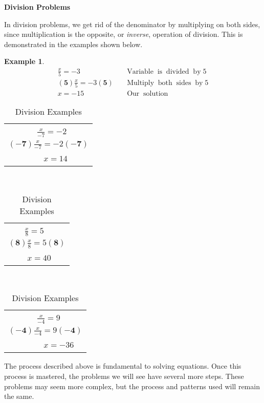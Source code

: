 \documentclass[12pt]{book}
\theoremstyle{definition}
\newtheorem{example}{Example}
\newcommand{\tmmathbf}[1]{\ensuremath{\boldsymbol{#1}}}
\newcommand{\tmop}[1]{\ensuremath{\operatorname{#1}}}
\begin{document}
\par
{\bf Division Problems}\par
In division problems, we get rid of the denominator by multiplying on both sides, since multiplication is the opposite, or \textit{inverse}, operation of division. This is demonstrated in the examples shown below.
\begin{example}\label{Lin11}
  \begin{eqnarray*}
    \frac{x}{5} = - 3 &  & \tmop{Variable} \tmop{is} \tmop{divided} \tmop{by}
    5\\
    \tmmathbf{(5)} \frac{x}{5} = - 3 \tmmathbf{(5)} &  & \tmop{Multiply}
    \tmop{both} \tmop{sides} \tmop{by} 5\\
    x = - 15 &  & \tmop{Our} \tmop{solution}
  \end{eqnarray*}
\end{example}

\begin{table}[h]
  \begin{tabular}{l}
    ~~~~~~~$ \frac{x}{- 7} = - 2$\\
    $\tmmathbf{(-7)}\frac{x}{- 7} = - 2\tmmathbf{(-7)}$\\
    ~~~~~~~~ $x = 14$
  \end{tabular} \ \ \ \ \ \ \ \ \ \ \ \ \ \ \begin{tabular}{l}
    ~~~~$ \frac{x}{8} = 5$\\
    $\tmmathbf{(8)} \frac{x}{8} = 5 \tmmathbf{(8)}$\\
    ~~~~ $x = 40$
  \end{tabular} \ \ \ \ \ \ \ \ \ \ \ \ \ \ \begin{tabular}{l}
    ~~~~~~~$ \frac{x}{- 4} = 9$\\
    $\tmmathbf{(-4)}\frac{x}{- 4} = 9\tmmathbf{(-4)}$\\
    ~~~~~~~~ $x = - 36$
  \end{tabular}
  \caption{Division Examples}
\end{table}
The process described above is fundamental to solving equations. Once this process is mastered, the problems we will see have several more steps. These problems may seem more complex, but the process and patterns used will remain the same.
\end{document}
